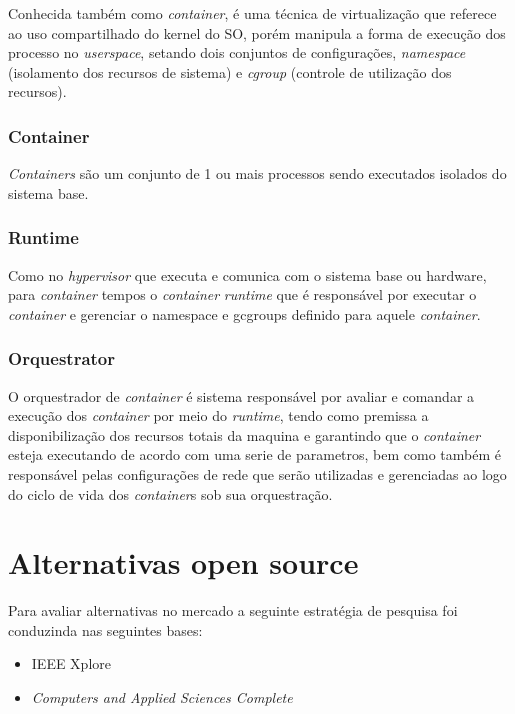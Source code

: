 Conhecida também como \emph{container}, é uma técnica de virtualização que referece ao uso compartilhado do kernel do SO, porém manipula a forma de execução dos processo no \emph{userspace}, setando dois conjuntos de configurações, \emph{namespace} (isolamento dos recursos de sistema) e \emph{cgroup} (controle de utilização dos recursos).

\cite{redhat2018}
\subsubsection{Container}
\emph{Containers} são um conjunto de 1 ou mais processos sendo executados isolados do sistema base.

\subsubsection{Runtime}
Como no \emph{hypervisor} que executa e comunica com o sistema base ou hardware, para \emph{container} tempos o \emph{container} \emph{runtime} que é responsável por executar o \emph{container} e gerenciar o namespace e gcgroups definido para aquele \emph{container}.

\subsubsection{Orquestrator}
O orquestrador de \emph{container} é sistema responsável por avaliar e comandar a execução dos \emph{container} por meio do \emph{runtime}, tendo como premissa a disponibilização dos recursos totais da maquina e garantindo que o \emph{container} esteja executando de acordo com uma  serie de parametros, bem como também é responsável pelas configurações de rede que serão utilizadas e gerenciadas ao logo do ciclo de vida dos \emph{container}s sob sua orquestração.

\section{Alternativas open source}

Para avaliar alternativas no mercado a seguinte estratégia de pesquisa foi conduzinda nas seguintes bases:

\begin{itemize}
    \item IEEE Xplore
    \item \emph{Computers and Applied Sciences Complete}
\end{itemize}

